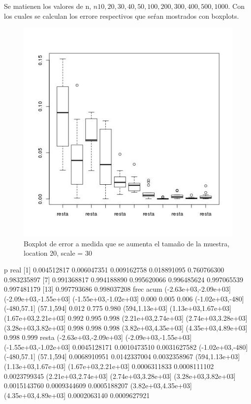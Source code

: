 \documentclass[letter,10pt]{article}
\begin{document}
\begin{itemize}
    Se matienen los valores de n, $n10,20,30,40,50,100,200,300,400,500,1000$. Con los cuales se calculan los errore respectivos que seŕan mostrados 
    con boxplots.
       \begin{figure}[H]
	      \centering
              \includegraphics[width=\linewidth]{p5b_boxplot.jpg}
              \caption{Boxplot de error a medida que se aumenta el tamaño de la muestra, location 20, scale = 30}
          \end{figure}
      
       p real
 [1] 0.004512817 0.006047351 0.009162758 0.018891095 0.760766300 0.983235897
 [7] 0.991368817 0.994188890 0.995620066 0.996485624 0.997065539 0.997481179
[13] 0.997793686 0.998037208
frec acum
(-2.63e+03,-2.09e+03] (-2.09e+03,-1.55e+03] (-1.55e+03,-1.02e+03] 
                0.000                 0.005                 0.006 
     (-1.02e+03,-480]           (-480,57.1]            (57.1,594] 
                0.012                 0.775                 0.980 
       (594,1.13e+03]   (1.13e+03,1.67e+03]   (1.67e+03,2.21e+03] 
                0.992                 0.995                 0.998 
  (2.21e+03,2.74e+03]   (2.74e+03,3.28e+03]   (3.28e+03,3.82e+03] 
                0.998                 0.998                 0.998 
  (3.82e+03,4.35e+03]   (4.35e+03,4.89e+03] 
                0.998                 0.999 
 resta
(-2.63e+03,-2.09e+03] (-2.09e+03,-1.55e+03] (-1.55e+03,-1.02e+03] 
         0.0045128171          0.0010473510          0.0031627582 
     (-1.02e+03,-480]           (-480,57.1]            (57.1,594] 
         0.0068910951          0.0142337004          0.0032358967 
       (594,1.13e+03]   (1.13e+03,1.67e+03]   (1.67e+03,2.21e+03] 
         0.0006311833          0.0008111102          0.0023799345 
  (2.21e+03,2.74e+03]   (2.74e+03,3.28e+03]   (3.28e+03,3.82e+03] 
         0.0015143760          0.0009344609          0.0005188207 
  (3.82e+03,4.35e+03]   (4.35e+03,4.89e+03] 
         0.0002063140          0.0009627921 
 
\end{itemize}
\end{document}
